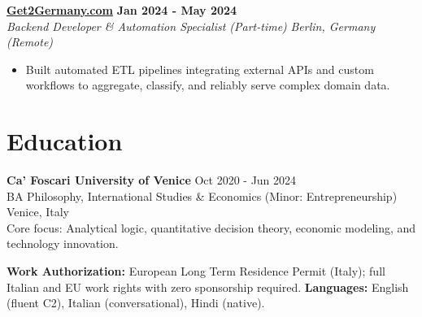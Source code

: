 \documentclass[a4paper,10pt]{article}
\newcommand{\role}[4]{%
 \textbf{#1} \hfill \textbf{#2}\\[1pt]%
 \textit{#3} \hfill \textit{#4}\\[2pt]%
}
\begin{document}
\role{\href{https://get2germany.com}{Get2Germany.com}}{Jan 2024 - May 2024}{Backend Developer \& Automation Specialist (Part-time)}{Berlin, Germany (Remote)}
\begin{itemize}
 \item Built automated ETL pipelines integrating external APIs and custom workflows to aggregate, classify, and reliably serve complex domain data.
\end{itemize}

\section{Education}
\textbf{Ca' Foscari University of Venice} \hfill Oct 2020 - Jun 2024\\
BA Philosophy, International Studies \& Economics (Minor: Entrepreneurship) \hfill Venice, Italy\\
{\footnotesize Core focus: Analytical logic, quantitative decision theory, economic modeling, and technology innovation.}

\vspace{2pt}
{\small \textbf{Work Authorization:} European Long Term Residence Permit (Italy); full Italian and EU work rights with zero sponsorship required. \quad \textbf{Languages:} English (fluent C2), Italian (conversational), Hindi (native).}
\end{document}
